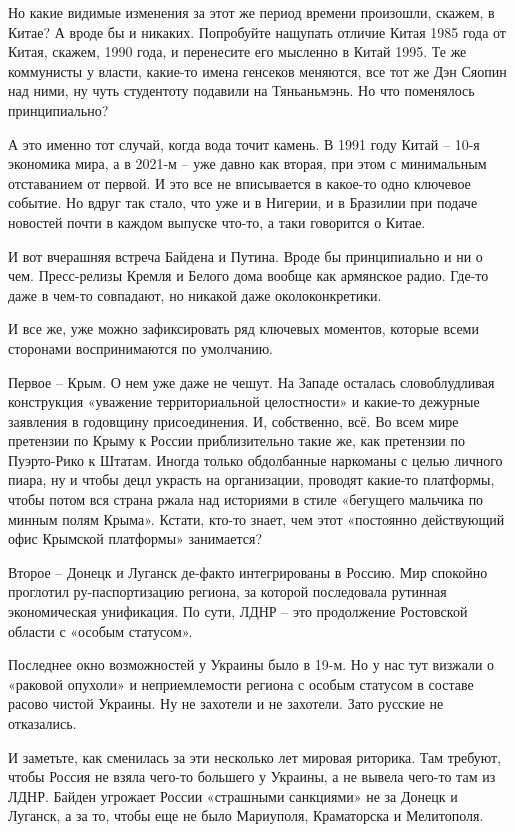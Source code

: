 Но какие видимые изменения за этот же период времени произошли, скажем, в
Китае? А вроде бы и никаких. Попробуйте нащупать отличие Китая 1985 года от
Китая, скажем, 1990 года, и перенесите его мысленно в Китай 1995. Те же
коммунисты у власти, какие-то имена генсеков меняются, все тот же Дэн Сяопин
над ними, ну чуть студентоту подавили на Тяньаньмэнь. Но что поменялось
принципиально?

А это именно тот случай, когда вода точит камень. В 1991 году Китай – 10-я
экономика мира, а в 2021-м – уже давно как вторая, при этом с минимальным
отставанием от первой. И это все не вписывается в какое-то одно ключевое
событие. Но вдруг так стало, что уже и в Нигерии, и в Бразилии при подаче
новостей почти в каждом выпуске что-то, а таки говорится о Китае.

И вот вчерашняя встреча Байдена и Путина. Вроде бы принципиально и ни о чем.
Пресс-релизы Кремля и Белого дома вообще как армянское радио. Где-то даже в
чем-то совпадают, но никакой даже околоконкретики.

И все же, уже можно зафиксировать ряд ключевых моментов, которые всеми
сторонами воспринимаются по умолчанию.

Первое – Крым. О нем уже даже не чешут. На Западе осталась словоблудливая
конструкция «уважение территориальной целостности» и какие-то дежурные
заявления в годовщину присоединения. И, собственно, всё. Во всем мире претензии
по Крыму к России приблизительно такие же, как претензии по Пуэрто-Рико к
Штатам. Иногда только обдолбанные наркоманы с целью личного пиара, ну и чтобы
децл украсть на организации, проводят какие-то платформы, чтобы потом вся
страна ржала над историями в стиле «бегущего мальчика по минным полям Крыма».
Кстати, кто-то знает, чем этот «постоянно действующий офис Крымской платформы»
занимается?

Второе – Донецк и Луганск де-факто интегрированы в Россию. Мир спокойно
проглотил ру-паспортизацию региона, за которой последовала рутинная
экономическая унификация. По сути, ЛДНР – это продолжение Ростовской области с
«особым статусом».

Последнее окно возможностей у Украины было в 19-м. Но у нас тут визжали о
«раковой опухоли» и неприемлемости региона с особым статусом в составе расово
чистой Украины. Ну не захотели и не захотели. Зато русские не отказались.

И заметьте, как сменилась за эти несколько лет мировая риторика. Там требуют,
чтобы Россия не взяла чего-то большего у Украины, а не вывела чего-то там из
ЛДНР. Байден угрожает России «страшными санкциями» не за Донецк и Луганск, а за
то, чтобы еще не было Мариуполя, Краматорска и Мелитополя.

